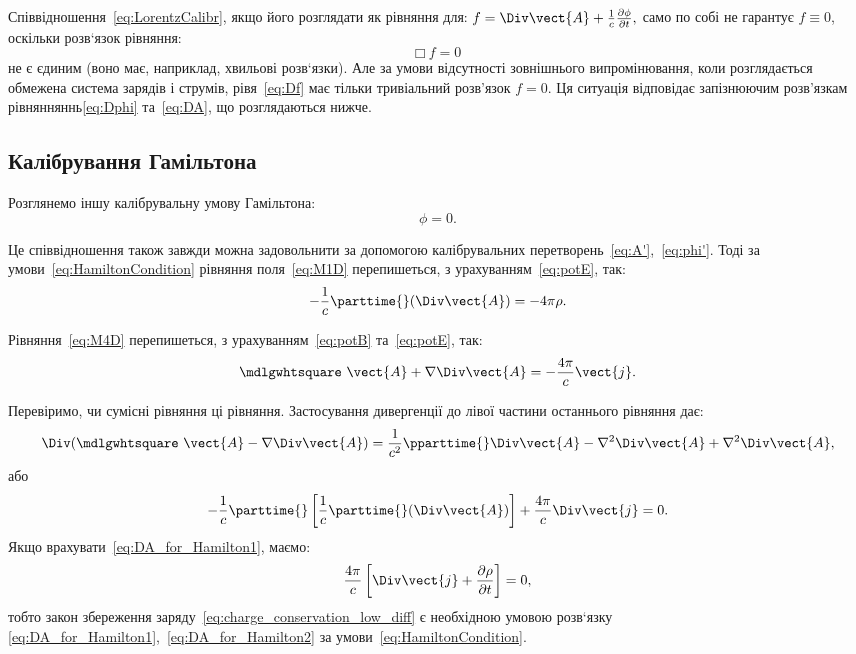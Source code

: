 Співвідношення~\eqref{eq:LorentzCalibr}, якщо його розглядати як рівняння для:
\(
	f = \Div \vect{A} + \frac{1}{c} \frac{\partial \phi}{\partial t},
\)
само по собі не гарантує $f \equiv 0$, оскільки розв`язок
рівняння:
\begin{equation}\label{eq:Df}
	\mdlgwhtsquare\ f = 0
\end{equation}
не є єдиним (воно має, наприклад, хвильові розв`язки). Але за умови
відсутності зовнішнього випромінювання, коли розглядається обмежена
система зарядів і струмів, рівя~\eqref{eq:Df} має тільки тривіальний розв'язок
$f=0$. Ця ситуація відповідає запізнюючим розв'язкам рівнянняннь\eqref{eq:Dphi} та~\eqref{eq:DA}, що
розглядаються нижче.


\subsection*{Калібрування Гамільтона}

Розглянемо іншу калібрувальну умову Гамільтона:
\begin{equation}\label{eq:HamiltonCondition}
	\phi = 0.
\end{equation}

Це співвідношення також завжди можна задовольнити за допомогою
калібрувальних перетворень~\eqref{eq:A'},~\eqref{eq:phi'}. Тоді за умови~\eqref{eq:HamiltonCondition} рівняння
поля~\eqref{eq:M1D} перепишеться, з урахуванням~\eqref{eq:potE}, так:
\begin{equation}
	-\frac1c \parttime{} (\Div \vect{A}) = -4\pi \rho.
\end{equation}

Рівняння~\eqref{eq:M4D} перепишеться, з урахуванням~\eqref{eq:potB} та~\eqref{eq:potE}, так:
\begin{equation}\label{eq:DA_for_Hamilton1}
	\mdlgwhtsquare\ \vect{A}  + \nabla \Div\vect{A} = -\frac{4\pi}{c} \vect{j}.
\end{equation}

Перевіримо, чи сумісні рівняння ці рівняння. Застосування
дивергенції до лівої частини останнього рівняння дає:
\begin{equation*}
	\Div(\mdlgwhtsquare\ \vect{A}  - \nabla \Div\vect{A}) = \frac1{c^2} \pparttime{} \Div\vect{A} - \nabla^2\Div\vect{A} + \nabla^2\Div\vect{A},
\end{equation*}
або
\begin{equation}\label{eq:DA_for_Hamilton2}
	-\frac1c \parttime{} \left[ \frac1c \parttime{} (\Div\vect{A})\right] + \frac{4\pi}c \Div\vect{j} = 0.
\end{equation}
Якщо врахувати~\eqref{eq:DA_for_Hamilton1}, маємо:
\begin{equation*}
	\frac{4\pi}c \left[\Div \vect{j} + \frac{\partial \rho}{\partial t}\right] = 0,
\end{equation*}
тобто закон збереження заряду~\eqref{eq:charge_conservation_low_diff} є необхідною умовою розв`язку
\eqref{eq:DA_for_Hamilton1},~\eqref{eq:DA_for_Hamilton2} за умови~\eqref{eq:HamiltonCondition}.


